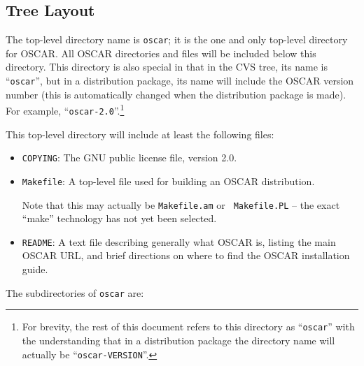 \subsection{Tree Layout}

The top-level directory name is {\tt oscar}; it is the one and only
top-level directory for OSCAR.  All OSCAR directories and files will
be included below this directory.  This directory is also special in
that in the CVS tree, its name is ``{\tt oscar}'', but in a
distribution package, its name will include the OSCAR version number
(this is automatically changed when the distribution package is made).
For example, ``{\tt oscar-2.0}''.\footnote{For brevity, the rest of
  this document refers to this directory as ``{\tt oscar}'' with the
  understanding that in a distribution package the directory name will
  actually be ``{\tt oscar-VERSION}''.}

This top-level directory will include at least the following files:

\begin{itemize}
\item {\tt COPYING}: The GNU public license file, version 2.0.

\item {\tt Makefile}: A top-level file used for building an OSCAR
  distribution.
  \begin{discuss}
    Note that this may actually be {\tt Makefile.am} or {\tt
      Makefile.PL} -- the exact ``make'' technology has not yet been
    selected.
  \end{discuss}

\item {\tt README}: A text file describing generally what OSCAR is,
  listing the main OSCAR URL, and brief directions on where to find
  the OSCAR installation guide.
\end{itemize}

\noindent The subdirectories of {\tt oscar} are:

